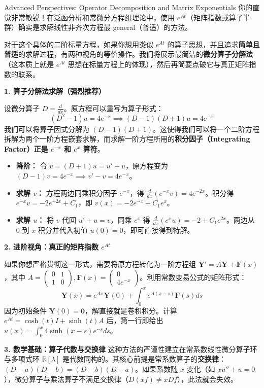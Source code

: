 \begin{remarkbox}{Advanced Perspectives: Operator Decomposition and Matrix Exponentials}
你的直觉非常敏锐！在泛函分析和常微分方程组理论中，使用 $e^{At}$（矩阵指数或算子半群）确实是求解线性非齐次方程最 general（普适）的方法。

对于这个具体的二阶标量方程，如果你想用类似 $e^{At}$ 的算子思想，并且追求\textbf{简单且普适}的求解过程，有两种视角的等价操作。我们将展示最简洁的\textbf{微分算子分解法}（这本质上就是 $e^{At}$ 思想在标量方程上的体现），然后再简要点破它与真正矩阵指数的联系。

\textbf{1. 算子分解法求解（强烈推荐）}

设微分算子 $D = \frac{d}{dx}$。原方程可以重写为算子形式：
\[ (D^2 - 1)u = 4e^{-x} \implies (D-1)(D+1)u = 4e^{-x} \]
我们可以将算子因式分解为 $(D-1)(D+1)$。这使得我们可以将一个二阶方程拆解为两个一阶方程嵌套求解，而求解一阶方程所用的\textbf{积分因子（Integrating Factor）正是 $e^{-x}$ 和 $e^x$ 算符}。

\begin{itemize}
    \item \textbf{降阶：} 令 $v = (D+1)u = u' + u$，原方程变为 $(D-1)v = 4e^{-x} \implies v' - v = 4e^{-x}$。
    \item \textbf{求解 $v$：} 方程两边同乘积分因子 $e^{-x}$，得 $\frac{d}{dx}(e^{-x}v) = 4e^{-2x}$。积分得 $e^{-x}v = -2e^{-2x} + C_1$，即 $v(x) = -2e^{-x} + C_1 e^x$。
    \item \textbf{求解 $u$：} 将 $v$ 代回 $u' + u = v$，同乘 $e^x$ 得 $\frac{d}{dx}(e^x u) = -2 + C_1 e^{2x}$。两边从 $0$ 到 $x$ 积分并代入初值 $u(0)=0$，即可直接得到特解。
\end{itemize}

\textbf{2. 进阶视角：真正的矩阵指数 $e^{At}$}

如果你想严格贯彻这一形式，需要将原方程转化为一阶方程组 $\mathbf{Y}' = A\mathbf{Y} + \mathbf{F}(x)$，其中 $A = \begin{pmatrix} 0 & 1 \\ 1 & 0 \end{pmatrix}, \mathbf{F}(x) = \begin{pmatrix} 0 \\ 4e^{-x} \end{pmatrix}$。利用常数变易公式的矩阵形式：
\[ \mathbf{Y}(x) = e^{Ax}\mathbf{Y}(0) + \int_0^x e^{A(x-s)}\mathbf{F}(s) ds \]
因为初始条件 $\mathbf{Y}(0) = \mathbf{0}$，解直接就是卷积积分。计算 $e^{At} = \cosh(t)I + \sinh(t)A$ 后，第一行即给出 $u(x) = \int_0^x 4\sinh(x-s)e^{-s} ds$。

\textbf{3. 数学基础：算子代数与交换律}
这种方法的严谨性建立在常系数线性微分算子环与多项式环 $\mathbb{R}[\lambda]$ 是代数同构的。其核心前提是常系数算子的\textbf{交换律}：$(D - a)(D - b) = (D - b)(D - a)$。如果系数随 $x$ 变化（如 $x u'' + u = 0$），微分算子与乘法算子不满足交换律（$D(xf) \neq xDf$），此法就会失效。
\end{remarkbox}

